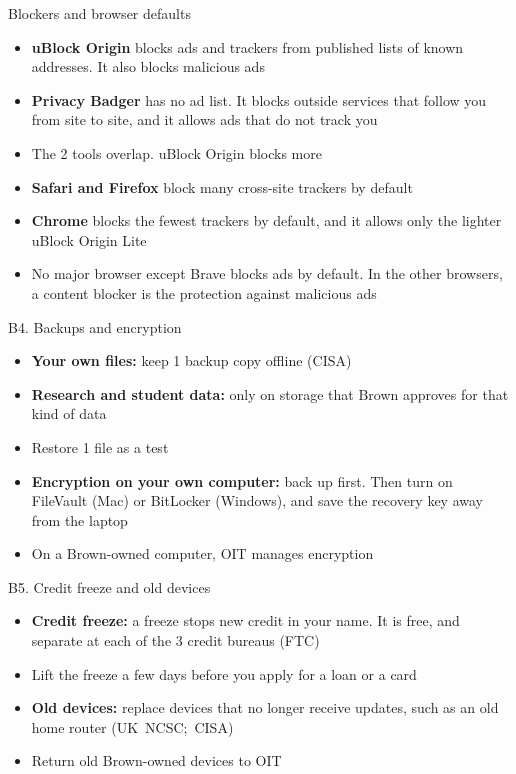 \documentclass[11pt]{beamer}
\newcommand{\srccite}[1]{{\scriptsize\textcolor{citecol}{#1}}}
\newcommand{\vfy}{\unskip}
\newcommand{\vfy}{\unskip\nobreakspace{\scriptsize\textcolor{citecol}{[verify]}}}
\renewcommand{\srccite}[1]{{\scriptsize\textcolor{citecol}{\mbox{#1}}}}
\begin{document}
\begin{frame}{Blockers and browser defaults}
\pause
\begin{itemize}\setlength\itemsep{7pt}
\item \textbf{uBlock Origin} blocks ads and trackers from published lists of known addresses. It also blocks malicious ads \vfy \pause
\item \textbf{Privacy Badger} has no ad list. It blocks outside services that follow you from site to site, and it allows ads that do not track you \vfy \pause
\item The 2 tools overlap. uBlock Origin blocks more \pause
\item \textbf{Safari and Firefox} block many cross-site trackers by default \vfy \pause
\item \textbf{Chrome} blocks the fewest trackers by default, and it allows only the lighter uBlock Origin Lite \vfy \pause
\item No major browser except Brave blocks ads by default. In the other browsers, a content blocker is the protection against malicious ads \vfy
\end{itemize}
\end{frame}


\begin{frame}{B4. Backups and encryption}
\pause
\begin{itemize}\setlength\itemsep{9pt}
\item \textbf{Your own files:} keep 1 backup copy offline \srccite{(CISA)} \vfy \pause
\item \textbf{Research and student data:} only on storage that Brown approves for that kind of data \pause
\item Restore 1 file as a test \pause
\item \textbf{Encryption on your own computer:} back up first. Then turn on FileVault (Mac) or BitLocker (Windows), and save the recovery key away from the laptop \vfy \pause
\item On a Brown-owned computer, OIT manages encryption
\end{itemize}
\end{frame}


\begin{frame}{B5. Credit freeze and old devices}
\pause
\begin{itemize}\setlength\itemsep{10pt}
\item \textbf{Credit freeze:} a freeze stops new credit in your name. It is free, and separate at each of the 3 credit bureaus \srccite{(FTC)} \vfy \pause
\item Lift the freeze a few days before you apply for a loan or a card \vfy \pause
\item \textbf{Old devices:} replace devices that no longer receive updates, such as an old home router \srccite{(UK NCSC; CISA)} \vfy \pause
\item Return old Brown-owned devices to OIT
\end{itemize}
\end{frame}
\end{document}
